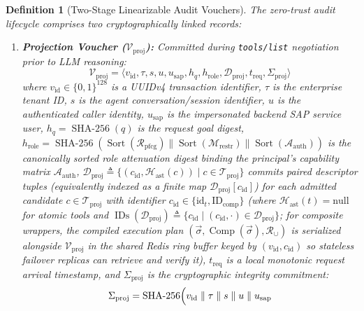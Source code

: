 \documentclass[conference,10pt]{IEEEtran}
\newtheorem{definition}{Definition}
\begin{document}
\begin{definition}[Two-Stage Linearizable Audit Vouchers]
The zero-trust audit lifecycle comprises two cryptographically linked records:
\begin{enumerate}
    \item \textbf{Projection Voucher ($\mathcal{V}_{\text{proj}}$):} Committed during \texttt{tools/list} negotiation prior to LLM reasoning:
    \begin{equation}
    \mathcal{V}_{\text{proj}} = \langle v_{\text{id}}, \tau, s, u, u_{\text{sap}}, h_q, h_{\text{role}}, \mathcal{D}_{\text{proj}}, t_{\text{req}}, \Sigma_{\text{proj}} \rangle
    \end{equation}
    where $v_{\text{id}} \in \{0,1\}^{128}$ is a UUIDv4 transaction identifier, $\tau$ is the enterprise tenant ID, $s$ is the agent conversation/session identifier, $u$ is the authenticated caller identity, $u_{\text{sap}}$ is the impersonated backend SAP service user, $h_q = \operatorname{SHA-256}(q)$ is the request goal digest, $h_{\text{role}} = \operatorname{SHA-256}(\operatorname{Sort}(\mathcal{R}_{\text{pfcg}}) \parallel \operatorname{Sort}(\mathcal{M}_{\text{restr}}) \parallel \operatorname{Sort}(\mathcal{A}_{\text{auth}}))$ is the canonically sorted role attenuation digest binding the principal's capability matrix $\mathcal{A}_{\text{auth}}$, $\mathcal{D}_{\text{proj}} \triangleq \{(c_{\text{id}}, \mathcal{H}_{\text{ast}}(c)) \mid c \in \mathcal{T}_{\text{proj}}\}$ commits paired descriptor tuples (equivalently indexed as a finite map $\mathcal{D}_{\text{proj}}[c_{\text{id}}]$) for each admitted candidate $c \in \mathcal{T}_{\text{proj}}$ with identifier $c_{\text{id}} \in \{\text{id}_t, \text{ID}_{\text{comp}}\}$ (where $\mathcal{H}_{\text{ast}}(t) = \text{null}$ for atomic tools and $\operatorname{IDs}(\mathcal{D}_{\text{proj}}) \triangleq \{c_{\text{id}} \mid (c_{\text{id}}, \cdot) \in \mathcal{D}_{\text{proj}}\}$; for composite wrappers, the compiled execution plan $(\vec{\sigma}, \operatorname{Comp}(\vec{\sigma}), \mathcal{R}_{\cup})$ is serialized alongside $\mathcal{V}_{\text{proj}}$ in the shared Redis ring buffer keyed by $(v_{\text{id}}, c_{\text{id}})$ so stateless failover replicas can retrieve and verify it), $t_{\text{req}}$ is a local monotonic request arrival timestamp, and $\Sigma_{\text{proj}}$ is the cryptographic integrity commitment:
    \begin{equation}
    \begin{aligned}
    \Sigma_{\text{proj}} = \operatorname{SHA-256}\Bigl(v_{\text{id}} &\parallel \tau \parallel s \parallel u \parallel u_{\text{sap}} \\

\end{aligned}
\end{equation}
\end{enumerate}
\end{definition}
\end{document}

